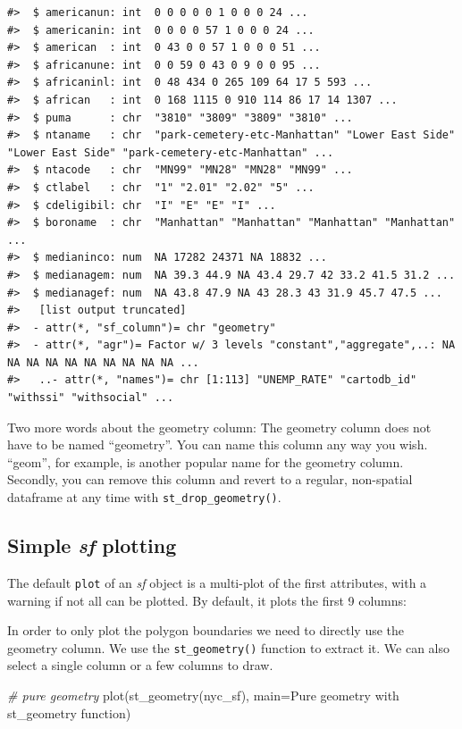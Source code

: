 \documentclass[
  11pt,
]{book}
\newenvironment{Shaded}{\begin{snugshade}}{\end{snugshade}}
\newcommand{\AttributeTok}[1]{\textcolor[rgb]{0.77,0.63,0.00}{#1}}
\newcommand{\CommentTok}[1]{\textcolor[rgb]{0.56,0.35,0.01}{\textit{#1}}}
\newcommand{\FunctionTok}[1]{\textcolor[rgb]{0.00,0.00,0.00}{#1}}
\newcommand{\NormalTok}[1]{#1}
\newcommand{\StringTok}[1]{\textcolor[rgb]{0.31,0.60,0.02}{#1}}
\begin{document}
\begin{verbatim}
#>  $ americanun: int  0 0 0 0 0 1 0 0 0 24 ...
#>  $ americanin: int  0 0 0 0 57 1 0 0 0 24 ...
#>  $ american  : int  0 43 0 0 57 1 0 0 0 51 ...
#>  $ africanune: int  0 0 59 0 43 0 9 0 0 95 ...
#>  $ africaninl: int  0 48 434 0 265 109 64 17 5 593 ...
#>  $ african   : int  0 168 1115 0 910 114 86 17 14 1307 ...
#>  $ puma      : chr  "3810" "3809" "3809" "3810" ...
#>  $ ntaname   : chr  "park-cemetery-etc-Manhattan" "Lower East Side" "Lower East Side" "park-cemetery-etc-Manhattan" ...
#>  $ ntacode   : chr  "MN99" "MN28" "MN28" "MN99" ...
#>  $ ctlabel   : chr  "1" "2.01" "2.02" "5" ...
#>  $ cdeligibil: chr  "I" "E" "E" "I" ...
#>  $ boroname  : chr  "Manhattan" "Manhattan" "Manhattan" "Manhattan" ...
#>  $ medianinco: num  NA 17282 24371 NA 18832 ...
#>  $ medianagem: num  NA 39.3 44.9 NA 43.4 29.7 42 33.2 41.5 31.2 ...
#>  $ medianagef: num  NA 43.8 47.9 NA 43 28.3 43 31.9 45.7 47.5 ...
#>   [list output truncated]
#>  - attr(*, "sf_column")= chr "geometry"
#>  - attr(*, "agr")= Factor w/ 3 levels "constant","aggregate",..: NA NA NA NA NA NA NA NA NA NA ...
#>   ..- attr(*, "names")= chr [1:113] "UNEMP_RATE" "cartodb_id" "withssi" "withsocial" ...
\end{verbatim}

Two more words about the geometry column: The geometry column does not have to be named ``geometry''. You can name this column any way you wish. ``geom'', for example, is another popular name for the geometry column. Secondly, you can remove this column and revert to a regular, non-spatial dataframe at any time with \texttt{st\_drop\_geometry()}.

\hypertarget{simple-sf-plotting}{%
\subsection{\texorpdfstring{Simple \emph{sf} plotting}{Simple sf plotting}}\label{simple-sf-plotting}}

The default \texttt{plot} of an \emph{sf} object is a multi-plot of the first attributes, with a warning if not all can be plotted. By default, it plots the first 9 columns:

In order to only plot the polygon boundaries we need to directly use the geometry column. We use the \texttt{st\_geometry()} function to extract it. We can also select a single column or a few columns to draw.

\begin{Shaded}
\begin{Highlighting}[]
\CommentTok{\# pure geometry}
\FunctionTok{plot}\NormalTok{(}\FunctionTok{st\_geometry}\NormalTok{(nyc\_sf), }\AttributeTok{main=}\StringTok{\textquotesingle{}Pure geometry with st\_geometry function\textquotesingle{}}\NormalTok{)}
\end{Highlighting}
\end{Shaded}
\end{document}
